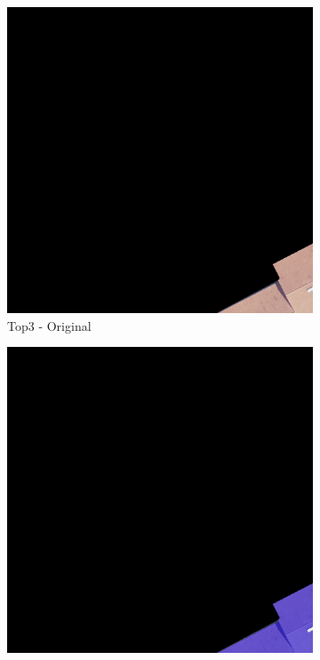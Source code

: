 \begin{figure}[H]
\begin{subfigure}{0.32\textwidth}
    \includegraphics[width=\textwidth]{02-main//figures/ch4/kfold_ensembles/segformer_tu-mambaout_base/best_cases/best_3_iou0.984_24931113_tile_13_18_a66e08_original.png}
    \caption{Top3 - Original}
\end{subfigure}
\hfill
\begin{subfigure}{0.32\textwidth}
    \includegraphics[width=\textwidth]{02-main//figures/ch4/kfold_ensembles/segformer_tu-mambaout_base/best_cases/best_3_iou0.984_24931113_tile_13_18_a66e08_overlay_gt.png}

\end{subfigure}
\end{figure}
